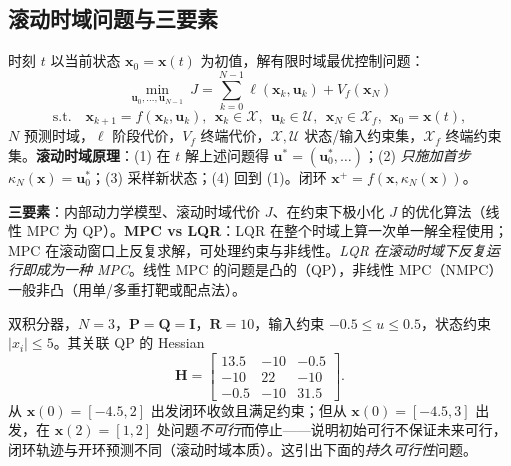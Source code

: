 \subsection{滚动时域问题与三要素}
\label{sec:ctrl-mpc-formulation}

时刻 $t$ 以当前状态 $\mathbf{x}_0=\mathbf{x}(t)$ 为初值，解有限时域最优控制问题\cite{borrelli2017predictive,rawlings2020mpc}：
\begin{equation}
  \min_{\mathbf{u}_0,\dots,\mathbf{u}_{N-1}}\ J=\sum_{k=0}^{N-1}\ell(\mathbf{x}_k,\mathbf{u}_k)+V_f(\mathbf{x}_N)
  \label{eq:ctrl-mpc-cost}
\end{equation}
\begin{equation}
  \text{s.t.}\quad\mathbf{x}_{k+1}=f(\mathbf{x}_k,\mathbf{u}_k),\ \ \mathbf{x}_k\in\mathcal{X},\ \ \mathbf{u}_k\in\mathcal{U},\ \ \mathbf{x}_N\in\mathcal{X}_f,\ \ \mathbf{x}_0=\mathbf{x}(t),
  \label{eq:ctrl-mpc-constr}
\end{equation}
$N$ 预测时域，$\ell$ 阶段代价，$V_f$ 终端代价，$\mathcal{X},\mathcal{U}$ 状态/输入约束集，$\mathcal{X}_f$ 终端约束集。\textbf{滚动时域原理}：(1) 在 $t$ 解上述问题得 $\mathbf{u}^*=(\mathbf{u}_0^*,\dots)$；(2) \emph{只施加首步} $\kappa_N(\mathbf{x})=\mathbf{u}_0^*$；(3) 采样新状态；(4) 回到 (1)。闭环 $\mathbf{x}^+=f(\mathbf{x},\kappa_N(\mathbf{x}))$。

\textbf{三要素}\cite{borrelli2017predictive}：内部动力学模型、滚动时域代价 $J$、在约束下极小化 $J$ 的优化算法（线性 MPC 为 QP）。\textbf{MPC vs LQR}：LQR 在整个时域上算一次单一解全程使用；MPC 在滚动窗口上反复求解，可处理约束与非线性。\emph{LQR 在滚动时域下反复运行即成为一种 MPC}。线性 MPC 的问题是凸的（QP），非线性 MPC（NMPC）一般非凸（用单/多重打靶或配点法）。

\begin{example}
\label{ex:ctrl-mpc-double-int}
 双积分器，$N=3$，$\mathbf{P}=\mathbf{Q}=\mathbf{I}$，$\mathbf{R}=10$，输入约束 $-0.5\le u\le0.5$，状态约束 $|x_i|\le5$。其关联 QP 的 Hessian
\[
  \mathbf{H}=\begin{bmatrix}13.5&-10&-0.5\\-10&22&-10\\-0.5&-10&31.5\end{bmatrix}.
\]
从 $\mathbf{x}(0)=[-4.5,2]$ 出发闭环收敛且满足约束；但从 $\mathbf{x}(0)=[-4.5,3]$ 出发，在 $\mathbf{x}(2)=[1,2]$ 处问题\emph{不可行}而停止——说明初始可行不保证未来可行，闭环轨迹与开环预测不同（滚动时域本质）。这引出下面的\emph{持久可行性}问题。
\end{example}

